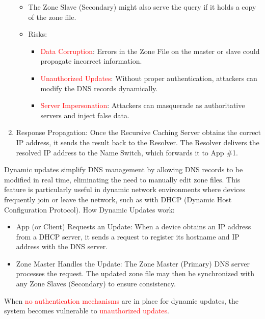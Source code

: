 \begin{enumerate}
\begin{itemize}
        \item The Zone Slave (Secondary) might also serve the query if it holds a copy of the zone file.
        \item Risks:
        \begin{itemize}
            \item \textcolor{Red}{Data Corruption}: Errors in the Zone File on the master or slave could propagate incorrect information.
            \item \textcolor{Red}{Unauthorized Updates}: Without proper authentication, attackers can modify the DNS records dynamically.
            \item \textcolor{Red}{Server Impersonation}: Attackers can masquerade as authoritative servers and inject false data.
        \end{itemize}
    \end{itemize}
    \item Response Propagation: Once the Recursive Caching Server obtains the correct IP address, it sends the result back to the Resolver. The Resolver delivers the resolved IP address to the Name Switch, which forwards it to App \#1.
\end{enumerate}

\begin{tcolorbox}[colback=blue!10!white, colframe=blue!50!white, title=Dynamic Updates]
    Dynamic updates simplify DNS management by allowing DNS records to be modified in real time, eliminating the need to manually edit zone files. This feature is particularly useful in dynamic network environments where devices frequently join or leave the network, such as with DHCP (Dynamic Host Configuration Protocol).
    How Dynamic Updates work:
    \begin{itemize}
        \item App (or Client) Requests an Update: When a device obtains an IP address from a DHCP server, it sends a request to register its hostname and IP address with the DNS server.
        \item Zone Master Handles the Update: The Zone Master (Primary) DNS server processes the request. The updated zone file may then be synchronized with any Zone Slaves (Secondary) to ensure consistency.
    \end{itemize}

    When \textcolor{Red}{no authentication mechanisms} are in place for dynamic updates, the system becomes vulnerable to \textcolor{Red}{unauthorized updates}.
\end{tcolorbox}

